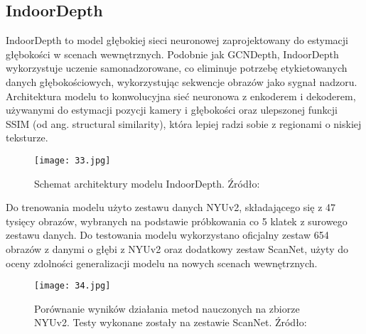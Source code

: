 \subsection{IndoorDepth}
IndoorDepth \cite{fan2023deeper} to model głębokiej sieci neuronowej zaprojektowany do estymacji głębokości w scenach wewnętrznych. Podobnie jak GCNDepth, IndoorDepth wykorzystuje uczenie samonadzorowane, co eliminuje potrzebę etykietowanych danych głębokościowych, wykorzystując sekwencje obrazów jako sygnał nadzoru. Architektura modelu to konwolucyjna sieć neuronowa z enkoderem i dekoderem, używanymi do estymacji pozycji kamery i głębokości oraz ulepszonej funkcji SSIM (od ang. structural similarity), która lepiej radzi sobie z regionami o niskiej teksturze.
\begin{figure}[H]
    \centering
    \texttt{[image: 33.jpg]}
    \caption{Schemat architektury modelu IndoorDepth. Źródło: \cite{fan2023deeper}}
    \label{fig:indoordepth-architecture}
\end{figure}
Do trenowania modelu użyto zestawu danych NYUv2, składającego się z 47 tysięcy obrazów, wybranych na podstawie próbkowania co 5 klatek z surowego zestawu danych. Do testowania modelu wykorzystano oficjalny zestaw 654 obrazów z danymi o głębi z NYUv2 oraz dodatkowy zestaw ScanNet, użyty do oceny zdolności generalizacji modelu na nowych scenach wewnętrznych.
\begin{figure}[H]
    \centering
    \texttt{[image: 34.jpg]}
    \caption{Porównanie wyników działania metod nauczonych na zbiorze NYUv2. Testy wykonane zostały na zestawie ScanNet. Źródło: \cite{fan2023deeper}}
    \label{fig:indoordepth-results}
\end{figure}

